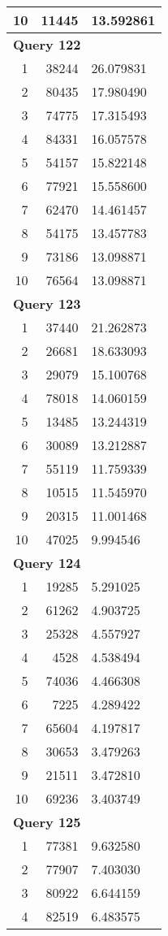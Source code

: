 \begin{longtable}[{p}]{@{}rrp{}@{}}
10 & 11445 & 13.592861 \\
\midrule
\multicolumn{3}{l}{\bfseries Query 122} \\
1 & 38244 & 26.079831 \\
2 & 80435 & 17.980490 \\
3 & 74775 & 17.315493 \\
4 & 84331 & 16.057578 \\
5 & 54157 & 15.822148 \\
6 & 77921 & 15.558600 \\
7 & 62470 & 14.461457 \\
8 & 54175 & 13.457783 \\
9 & 73186 & 13.098871 \\
10 & 76564 & 13.098871 \\
\midrule
\multicolumn{3}{l}{\bfseries Query 123} \\
1 & 37440 & 21.262873 \\
2 & 26681 & 18.633093 \\
3 & 29079 & 15.100768 \\
4 & 78018 & 14.060159 \\
5 & 13485 & 13.244319 \\
6 & 30089 & 13.212887 \\
7 & 55119 & 11.759339 \\
8 & 10515 & 11.545970 \\
9 & 20315 & 11.001468 \\
10 & 47025 & 9.994546 \\
\midrule
\multicolumn{3}{l}{\bfseries Query 124} \\
1 & 19285 & 5.291025 \\
2 & 61262 & 4.903725 \\
3 & 25328 & 4.557927 \\
4 & 4528 & 4.538494 \\
5 & 74036 & 4.466308 \\
6 & 7225 & 4.289422 \\
7 & 65604 & 4.197817 \\
8 & 30653 & 3.479263 \\
9 & 21511 & 3.472810 \\
10 & 69236 & 3.403749 \\
\midrule
\multicolumn{3}{l}{\bfseries Query 125} \\
1 & 77381 & 9.632580 \\
2 & 77907 & 7.403030 \\
3 & 80922 & 6.644159 \\
4 & 82519 & 6.483575 \\

\end{longtable}

